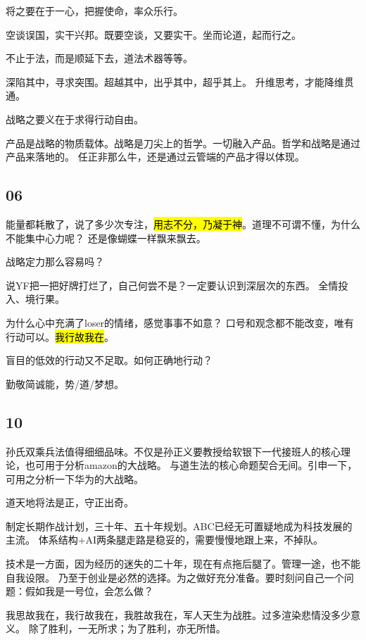 将之要在于一心，把握使命，率众乐行。

空谈误国，实干兴邦。既要空谈，又要实干。坐而论道，起而行之。

不止于法，而是顺延下去，道法术器等等。

深陷其中，寻求突围。超越其中，出乎其中，超乎其上。
升维思考，才能降维贯通。

战略之要义在于求得行动自由。

\hrulefill

产品是战略的物质载体。战略是刀尖上的哲学。一切融入产品。哲学和战略是通过产品来落地的。
任正非那么牛，还是通过云管端的产品才得以体现。

\subsection{06}

能量都耗散了，说了多少次专注，\hl{用志不分，乃凝于神}。道理不可谓不懂，为什么不能集中心力呢？
还是像蝴蝶一样飘来飘去。

战略定力那么容易吗？

说YF把一把好牌打烂了，自己何尝不是？一定要认识到深层次的东西。
全情投入、境行果。

\hrulefill

为什么心中充满了loser的情绪，感觉事事不如意？
口号和观念都不能改变，唯有行动可以。\hl{我行故我在}。

盲目的低效的行动又不足取。如何正确地行动？

勤敬简诚能，势/道/梦想。

\subsection{10}

孙氏双乘兵法值得细细品味。不仅是孙正义要教授给软银下一代接班人的核心理论，也可用于分析amazon的大战略。
与道生法的核心命题契合无间。引申一下，可用之分析一下华为的大战略。

道天地将法是正，守正出奇。

制定长期作战计划，三十年、五十年规划。ABC已经无可置疑地成为科技发展的主流。
体系结构+AI两条腿走路是稳妥的，需要慢慢地跟上来，不掉队。

技术是一方面，因为经历的迷失的二十年，现在有点拖后腿了。管理一途，也不能自我设限。
乃至于创业是必然的选择。为之做好充分准备。要时刻问自己一个问题：假如我是一号位，会怎么做？

我思故我在，我行故我在，我胜故我在，军人天生为战胜。过多渲染悲情没多少意义。
除了胜利，一无所求；为了胜利，亦无所惜。

